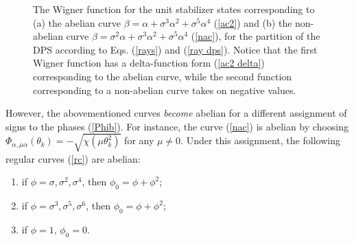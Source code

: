 \documentclass[quantumrep,article,submit,pdftex,moreauthors]{Definitions/mdpi}
\begin{document}
\begin{figure}[ht]
    \centering
	\quad
	\caption{
		The Wigner function for the unit stabilizer states corresponding to (a)
		the abelian curve $\beta = \alpha + \sigma^3 \alpha^2 + \sigma^5
		\alpha^4$ (\ref{ac2}) and (b) the non-abelian curve $\beta = \sigma^2
		\alpha + \sigma^3 \alpha^2 + \sigma^{5}\alpha^{4}$ (\ref{nac}), for the
		partition of the DPS according to Eqs. (\ref{rays}) and (\ref{ray dps}).
		Notice that the first Wigner function has a delta-function form
		(\ref{ac2 delta}) corresponding to the abelian curve, while the second
		function corresponding to a non-abelian curve takes on negative values.
	}
    \label{fig1}
\end{figure}

However, the abovementioned curves \textit{become} abelian for a different
assignment of signs to the phases (\ref{Phib}). For instance, the curve
(\ref{nac}) is abelian by choosing $\Phi_{\alpha,\mu \alpha }(\theta_{k}) =
-\sqrt{\chi\left(\mu \theta_{k}^{2}\right)}$ for any $\mu \neq 0$. Under this
assignment, the following regular curves (\ref{rc}) are abelian:

\begin{enumerate}
  \item if $\phi = \sigma, \sigma^{2}, \sigma^{4}$, then $\phi_{0} = \phi +
    \phi^{2}$;
  \item if $\phi = \sigma^{3}, \sigma^{5}, \sigma^{6}$, then $\phi_{0} = \phi +
  \phi^{2}$;
  \item if $\phi = 1$, $\phi_{0} = 0$.
\end{enumerate}
\end{document}
